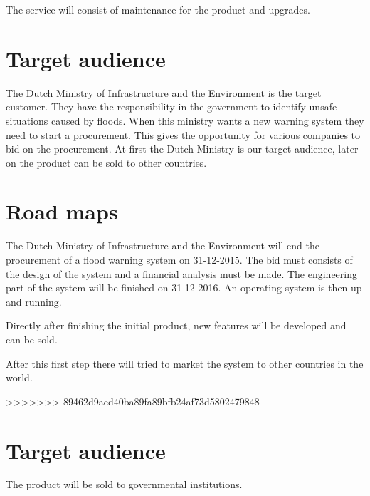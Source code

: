 The service will consist of maintenance for the product and upgrades.

\section{Target audience}
The Dutch Ministry of Infrastructure and the Environment is the target customer. They have the responsibility in the government to identify unsafe situations caused by floods. When this ministry wants a new warning system they need to start a procurement. This gives the opportunity for various companies to bid on the procurement. At first the Dutch Ministry is our target audience, later on the product can be sold to other countries.


\section{Road maps}
The Dutch Ministry of Infrastructure and the Environment will end the procurement of a flood warning system on 31-12-2015. The bid must consists of the design of the system and a financial analysis must be made. The engineering part of the system will be finished on 31-12-2016. An operating system is then up and running.

Directly after finishing the initial product, new features will be developed and can be sold.

After this first step there will tried to market the system to other countries in the world. 

>>>>>>> 89462d9aed40ba89fa89bfb24af73d5802479848

\section{Target audience}
The product will be sold to governmental institutions. 

